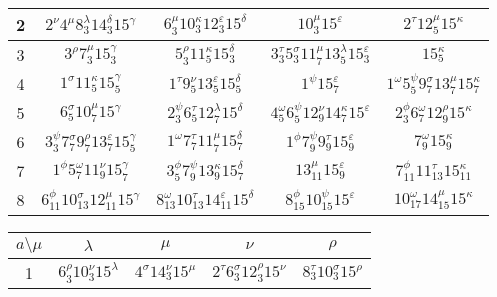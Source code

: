 \documentclass[a4paper,12pt]{report}
\begin{document}
\begin{center}
\begin{tabular}{|c|c|c|c|c|}
2 & $2^{\nu}4^{\mu}8_{3}^{\lambda}14_{3}^{\delta}15^{\gamma}$ & $6_{3}^{\mu}10_{3}^{\kappa}12_{3}^{\varepsilon}15^{\delta}$ & $10_{3}^{\mu}15^{\varepsilon}$ & $2^{\tau}12_{5}^{\mu}15^{\kappa}$  \\
\hline

3 & $3^{\rho}7_{3}^{\mu}15_{3}^{\gamma}$ & $5_{3}^{\rho}11_{5}^{\kappa}15_{3}^{\delta}$ & $3_{3}^{\tau}5_{3}^{\sigma}11_{7}^{\mu}13_{5}^{\lambda}15_{3}^{\varepsilon}$ & $15_{5}^{\kappa}$  \\
\hline

4 & $1^{\sigma}11_{5}^{\kappa}15_{5}^{\gamma}$ & $1^{\tau}9_{5}^{\nu}13_{5}^{\varepsilon}15_{5}^{\delta}$ & $1^{\psi}15_{7}^{\varepsilon}$ & $1^{\omega}5_{5}^{\psi}9_{7}^{\sigma}13_{7}^{\mu}15_{7}^{\kappa}$  \\
\hline

5 & $6_{5}^{\sigma}10_{7}^{\mu}15^{\gamma}$ & $2_{3}^{\psi}6_{5}^{\tau}12_{7}^{\lambda}15^{\delta}$ & $4_{5}^{\omega}6_{5}^{\psi}12_{9}^{\nu}14_{7}^{\kappa}15^{\varepsilon}$ & $2_{3}^{\phi}6_{7}^{\omega}12_{9}^{\rho}15^{\kappa}$  \\
\hline

6 & $3_{3}^{\psi}7_{7}^{\sigma}9_{7}^{\rho}13_{7}^{\varepsilon}15_{5}^{\gamma}$ &
$1^{\omega}7_{7}^{\tau}11_{7}^{\mu}15_{7}^{\delta}$ & $1^{\phi}7_{9}^{\psi}9_{9}^{\tau}15_{9}^{\varepsilon}$ &
$7_{9}^{\omega}15_{9}^{\kappa}$
\\ \hline

7 & $1^{\phi}5_{7}^{\omega}11_{9}^{\nu}15_{7}^{\gamma}$ & $3_{5}^{\phi}7_{9}^{\psi}13_{9}^{\kappa}15_{7}^{\delta}$ & $13_{11}^{\mu}15_{9}^{\varepsilon}$ & $7_{11}^{\phi}11_{13}^{\tau}15_{11}^{\kappa}$  \\
\hline

8 & $6_{11}^{\phi}10_{13}^{\sigma}12_{11}^{\mu}15^{\gamma}$ & $8_{13}^{\omega}10_{13}^{\tau}14_{11}^{\varepsilon}15^{\delta}$ & $8_{15}^{\phi}10_{15}^{\psi}15^{\varepsilon}$ & $10_{17}^{\omega}14_{15}^{\mu}15^{\kappa}$ \\
\hline

\end{tabular}

\begin{tabular}{|c|c|c|c|c|}\hline
 $ a\setminus\mu$  & $\lambda$ & \hspace{1cm} $\mu$ \hspace{1cm} & \hspace{1cm} $\nu$ \hspace{1cm} & \hspace{1cm} $\rho$ \hspace{1cm}   \\ \hline
1 & $6_{3}^{\rho}10_{3}^{\nu}15^{\lambda}$ & $4^{\sigma}14_{3}^{\nu}15^{\mu}$ & $2^{\tau}6_{3}^{\sigma}12_{3}^{\rho}15^{\nu}$ & $8_{3}^{\tau}10_{3}^{\sigma}15^{\rho}$  \\
\hline


\end{tabular}
\end{center}
\end{document}
